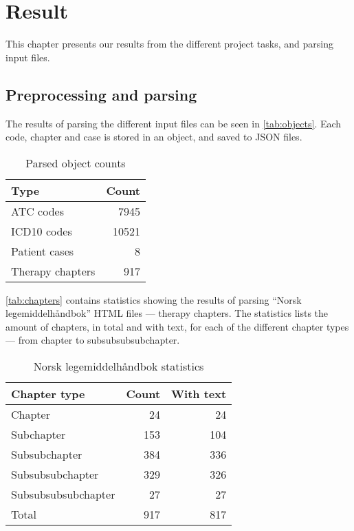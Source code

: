 \chapter{Result}
This chapter presents our results from the different project tasks, and
parsing input files.


\section{Preprocessing and parsing}
The results of parsing the different input files can be seen in
\autoref{tab:objects}. Each code, chapter and case is stored in an object,
and saved to JSON files.
\begin{table}[htbp] \footnotesize \center
\caption{Parsed object counts\label{tab:objects}}
\begin{tabular}{l r}
    \toprule
    Type & Count \\
    \midrule
	ATC codes & 7945 \\
	ICD10 codes & 10521 \\
	Patient cases & 8 \\
	Therapy chapters & 917 \\
	\bottomrule
\end{tabular}
\end{table}

\autoref{tab:chapters} contains statistics showing the results of parsing
``Norsk legemiddelhåndbok'' HTML files --- therapy chapters. The statistics
lists the amount of chapters, in total and with text, for each of the
different chapter types --- from chapter to subsubsubsubchapter.
\begin{table}[htbp] \footnotesize \center
\caption{Norsk legemiddelhåndbok statistics\label{tab:chapters}}
\begin{tabular}{l r r}
    \toprule
    Chapter type & Count & With text \\
    \midrule
	Chapter & 24 & 24 \\
	Subchapter & 153 & 104 \\
	Subsubchapter & 384 & 336 \\
	Subsubsubchapter & 329 & 326 \\
	Subsubsubsubchapter & 27 & 27 \\
    \midrule
	Total & 917 & 817 \\
	\bottomrule
\end{tabular}
\end{table}

